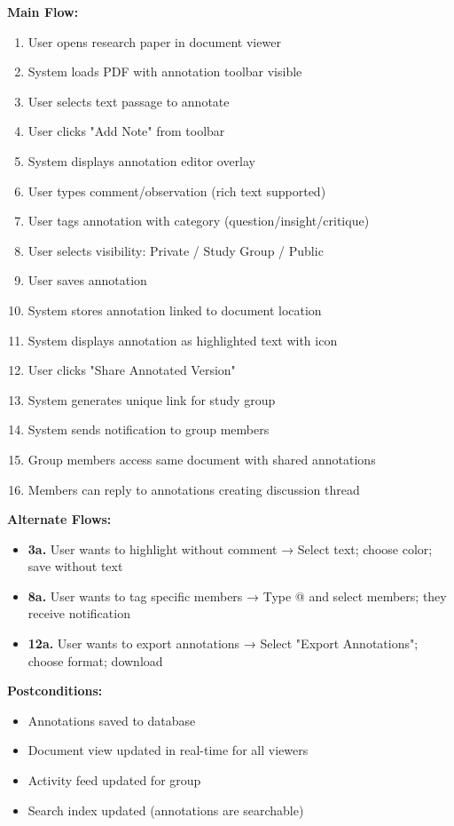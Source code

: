\documentclass[12pt,a4paper]{report}
\begin{document}
\textbf{Main Flow:}
\begin{enumerate}
    \item User opens research paper in document viewer
    \item System loads PDF with annotation toolbar visible
    \item User selects text passage to annotate
    \item User clicks "Add Note" from toolbar
    \item System displays annotation editor overlay
    \item User types comment/observation (rich text supported)
    \item User tags annotation with category (question/insight/critique)
    \item User selects visibility: Private / Study Group / Public
    \item User saves annotation
    \item System stores annotation linked to document location
    \item System displays annotation as highlighted text with icon
    \item User clicks "Share Annotated Version"
    \item System generates unique link for study group
    \item System sends notification to group members
    \item Group members access same document with shared annotations
    \item Members can reply to annotations creating discussion thread
\end{enumerate}

\textbf{Alternate Flows:}
\begin{itemize}
    \item \textbf{3a.} User wants to highlight without comment → Select text; choose color; save without text
    \item \textbf{8a.} User wants to tag specific members → Type @ and select members; they receive notification
    \item \textbf{12a.} User wants to export annotations → Select "Export Annotations"; choose format; download
\end{itemize}

\textbf{Postconditions:}
\begin{itemize}
    \item Annotations saved to database
    \item Document view updated in real-time for all viewers
    \item Activity feed updated for group
    \item Search index updated (annotations are searchable)
\end{itemize}
\end{document}
